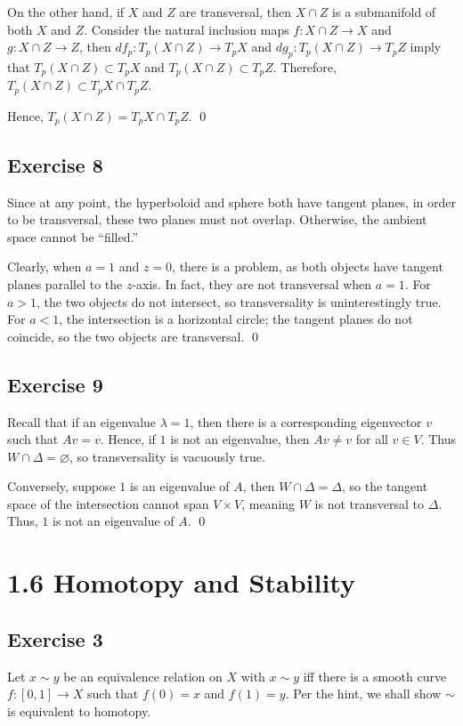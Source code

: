 \documentclass{article}
\begin{document}
    On the other hand, if $X$ and $Z$ are transversal, then $X\cap Z$ is a
    submanifold of both $X$ and $Z$. Consider the natural inclusion maps $f
    \colon X\cap Z\to X$ and $g\colon X\cap Z\to Z$, then $df_p\colon T_p(X\cap
    Z)\to T_pX$ and $dg_p\colon T_p(X\cap Z)\to T_pZ$ imply that
    $T_p(X\cap Z)\subset T_pX$ and $T_p(X\cap Z)\subset T_pZ$.
    Therefore, $T_p(X\cap Z)\subset T_pX\cap T_pZ$.

    Hence, $T_p(X\cap Z)=T_pX\cap T_pZ$.
    \qed

  \subsection*{Exercise 8}
    Since at any point, the hyperboloid and sphere both have tangent planes,
    in order to be transversal, these two planes must not overlap. Otherwise,
    the ambient space cannot be ``filled.''

    Clearly, when $a=1$ and $z=0$, there is a problem, as both objects have
    tangent planes parallel to the $z$-axis. In fact, they are not transversal
    when $a=1$. For $a>1$, the two objects do not intersect, so transversality
    is uninterestingly true. For $a<1$, the intersection is a horizontal circle;
    the tangent planes do not coincide, so the two objects are transversal.
    \qed

  \subsection*{Exercise 9}
    Recall that if an eigenvalue $\lambda=1$, then there is a corresponding
    eigenvector $v$ such that $Av=v$. Hence, if $1$ is not an eigenvalue, then
    $Av\ne v$ for all $v\in V$. Thus $W\cap\Delta=\varnothing$, so
    transversality is vacuously true.

    Conversely, suppose $1$ is an eigenvalue of $A$, then $W\cap\Delta=\Delta$,
    so the tangent space of the intersection cannot span $V\times V$, meaning
    $W$ is not transversal to $\Delta$. Thus, $1$ is not an eigenvalue of $A$.
    \qed

\section*{1.6 Homotopy and Stability}
  \subsection*{Exercise 3}
    Let $x\sim y$ be an equivalence relation on $X$ with $x\sim y$ iff there is
    a smooth curve $f\colon[0,1]\to X$ such that $f(0)=x$ and $f(1)=y$. Per the
    hint, we shall show $\sim$ is equivalent to homotopy.
\end{document}
